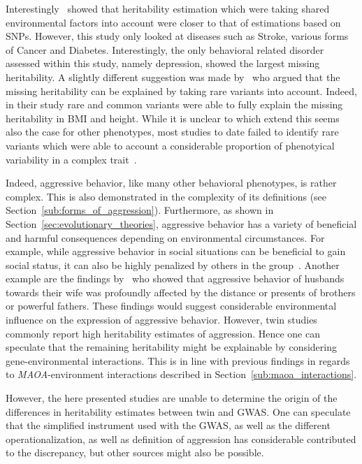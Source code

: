 Interestingly~\citet{Munoz2016a} showed that heritability estimation which were taking shared environmental factors into account were closer to that of estimations based on SNPs.
However, this study only looked at diseases such as Stroke, various forms of Cancer and Diabetes.
Interestingly, the only behavioral related disorder assessed within this study, namely depression, showed the largest missing heritability.
A slightly different suggestion was made by~\citet{Yang2015} who argued that the missing heritability can be explained by taking rare variants into account.
Indeed, in their study rare and common variants were able to fully explain the missing heritability in BMI and height.
While it is unclear to which extend this seems also the case for other phenotypes, most studies to date failed to identify rare variants which were able to account a considerable proportion of phenotyical variability in a complex trait~\cite{Chabris2015,Wray2011}.

Indeed, aggressive behavior, like many other behavioral phenotypes, is rather complex.
This is also demonstrated in the complexity of its definitions (see Section~\ref{sub:forms_of_aggression}).
Furthermore, as shown in Section~\ref{sec:evolutionary_theories}, aggressive behavior has a variety of beneficial and harmful consequences depending on environmental circumstances. 
For example, while aggressive behavior in social situations can be beneficial to gain social status, it can also be highly penalized by others in the group~\cite{Buss1997}.
Another example are the findings by~\citet{Figueredo1995} who showed that aggressive behavior of husbands towards their wife was profoundly affected by the distance or presents of brothers or powerful fathers.
These findings would suggest considerable environmental influence on the expression of aggressive behavior.
However, twin studies commonly report high heritability estimates of aggression.
Hence one can speculate that the remaining heritability might be explainable by considering gene-environmental interactions.
This is in line with previous findings in regards to \textit{MAOA}-environment interactions described in Section~\ref{sub:maoa_interactions}.

However, the here presented studies are unable to determine the origin of the differences in heritability estimates between twin and GWAS\@.
One can speculate that the simplified instrument used with the GWAS, as well as the different operationalization, as well as definition of aggression has considerable contributed to the discrepancy, but other sources might also be possible.

